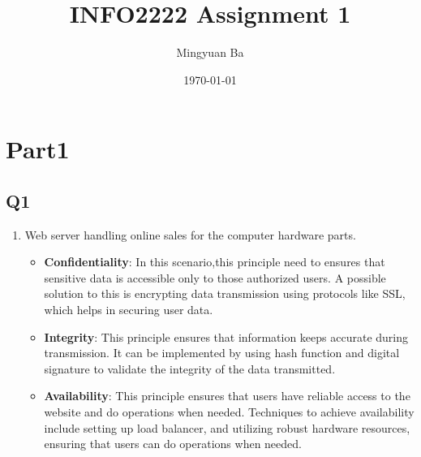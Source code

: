 \documentclass{article}
\begin{document}
\title{INFO2222 Assignment 1}
\author{Mingyuan Ba}
\date{\today}
\maketitle


\section{Part1}
\subsection{Q1}
\begin{enumerate}
    \item Web server handling online sales for the computer hardware parts.
        \begin{itemize}
            \item \textbf{Confidentiality}: In this scenario,this principle need to ensures that sensitive data is accessible only to those authorized users\cite{Lecture1}. A possible solution to this is encrypting data transmission using protocols like SSL, which helps in securing user data.
            \item \textbf{Integrity}: This principle ensures that information keeps accurate during transmission\cite{Lecture1}. It can be implemented by using hash function\cite{2-1-1.Hash(1)} and digital signature to validate the integrity of the data transmitted.
            \item \textbf{Availability}: This principle ensures that users have reliable access to the website and do operations when needed\cite{Lecture1}. Techniques to achieve availability include setting up load balancer\cite{AlibabaCloud2019HighAvailability}, and utilizing robust hardware resources, ensuring that users can do operations when needed.
        \end{itemize}
        

\end{enumerate}
\end{document}
